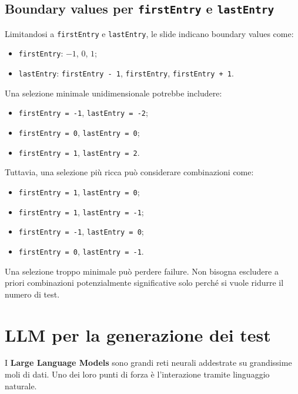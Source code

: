 \subsection{Boundary values per \texttt{firstEntry} e \texttt{lastEntry}}

Limitandosi a \texttt{firstEntry} e \texttt{lastEntry}, le slide indicano boundary values come:

\begin{itemize}
    \item \texttt{firstEntry}: \(-1\), \(0\), \(1\);
    \item \texttt{lastEntry}: \texttt{firstEntry - 1}, \texttt{firstEntry}, \texttt{firstEntry + 1}.
\end{itemize}

Una selezione minimale unidimensionale potrebbe includere:

\begin{itemize}
    \item \texttt{firstEntry = -1}, \texttt{lastEntry = -2};
    \item \texttt{firstEntry = 0}, \texttt{lastEntry = 0};
    \item \texttt{firstEntry = 1}, \texttt{lastEntry = 2}.
\end{itemize}

Tuttavia, una selezione più ricca può considerare combinazioni come:

\begin{itemize}
    \item \texttt{firstEntry = 1}, \texttt{lastEntry = 0};
    \item \texttt{firstEntry = 1}, \texttt{lastEntry = -1};
    \item \texttt{firstEntry = -1}, \texttt{lastEntry = 0};
    \item \texttt{firstEntry = 0}, \texttt{lastEntry = -1}.
\end{itemize}

\begin{notaesame}
Una selezione troppo minimale può perdere failure. Non bisogna escludere a priori combinazioni potenzialmente significative solo perché si vuole ridurre il numero di test.
\end{notaesame}

\section{LLM per la generazione dei test}

I \textbf{Large Language Models} sono grandi reti neurali addestrate su grandissime moli di dati. Uno dei loro punti di forza è l'interazione tramite linguaggio naturale.

